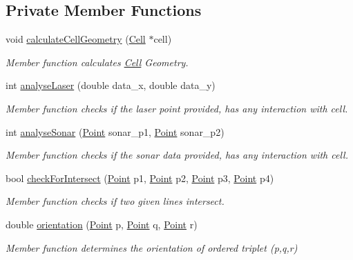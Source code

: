 \subsection*{Private Member Functions}
\begin{DoxyCompactItemize}
\item 
void \hyperlink{classRangerFusion_a5f2963a4d53c84e5ba293a25fd67fb2f}{calculate\+Cell\+Geometry} (\hyperlink{classCell}{Cell} $\ast$cell)
\begin{DoxyCompactList}\small\item\em Member function calculates \hyperlink{classCell}{Cell} Geometry. \end{DoxyCompactList}\item 
int \hyperlink{classRangerFusion_afa8523c62b05aa5d6d5fa2bf22d7219d}{analyse\+Laser} (double data\+\_\+x, double data\+\_\+y)
\begin{DoxyCompactList}\small\item\em Member function checks if the laser point provided, has any interaction with cell. \end{DoxyCompactList}\item 
int \hyperlink{classRangerFusion_a18d2a54f882b09d9041c952f957e324c}{analyse\+Sonar} (\hyperlink{structPoint}{Point} sonar\+\_\+p1, \hyperlink{structPoint}{Point} sonar\+\_\+p2)
\begin{DoxyCompactList}\small\item\em Member function checks if the sonar data provided, has any interaction with cell. \end{DoxyCompactList}\item 
bool \hyperlink{classRangerFusion_a16257a2c9e7e482de25bc8a0968c2e70}{check\+For\+Intersect} (\hyperlink{structPoint}{Point} p1, \hyperlink{structPoint}{Point} p2, \hyperlink{structPoint}{Point} p3, \hyperlink{structPoint}{Point} p4)
\begin{DoxyCompactList}\small\item\em Member function checks if two given lines intersect. \end{DoxyCompactList}\item 
double \hyperlink{classRangerFusion_af73b5c54aacf13aea39e2f18916b6608}{orientation} (\hyperlink{structPoint}{Point} p, \hyperlink{structPoint}{Point} q, \hyperlink{structPoint}{Point} r)
\begin{DoxyCompactList}\small\item\em Member function determines the orientation of ordered triplet (p,q,r) \end{DoxyCompactList}\item 

\end{DoxyCompactItemize}
